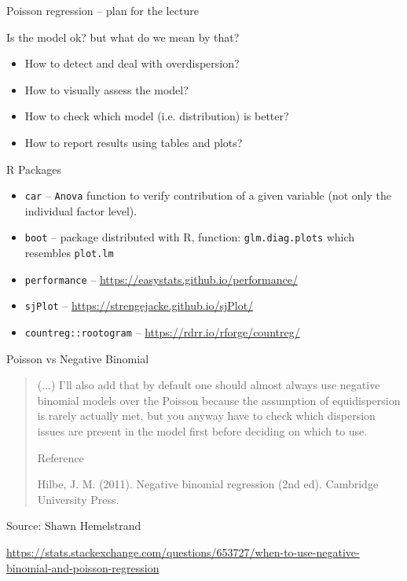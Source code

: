 \documentclass[10pt,ignorenonframetext,aspectratio=169]{beamer}
\begin{document}


\begin{frame}{Poisson regression -- plan for the lecture}

Is the model ok? but what do we mean by that? 
    \begin{itemize}
        \item How to detect and deal with overdispersion?
        \item How to visually assess the model?
        \item How to check which model (i.e. distribution) is better?
        \item How to report results using tables and plots?
    \end{itemize}
    
    \vspace{0.5cm}
    
    R Packages
    \begin{itemize}
    \item \texttt{car} -- \texttt{Anova} function to verify contribution of a given variable (not only the individual factor level).
    \item \texttt{boot} -- package distributed with R, function: \texttt{glm.diag.plots} which resembles \texttt{plot.lm} 
    \item \texttt{performance} -- \url{https://easystats.github.io/performance/}
    \item \texttt{sjPlot} -- \url{https://strengejacke.github.io/sjPlot/}
    \item \texttt{countreg::rootogram} -- \url{https://rdrr.io/rforge/countreg/}
\end{itemize}

\end{frame}

\begin{frame}{Poisson vs Negative Binomial}


\begin{quote}
(...) I'll also add that by default one should almost always use negative binomial models over the Poisson because the assumption of equidispersion is rarely actually met, but you anyway have to check which dispersion issues are present in the model first before deciding on which to use.

Reference

Hilbe, J. M. (2011). Negative binomial regression (2nd ed). Cambridge University Press.
\end{quote}

Source: Shawn Hemelstrand

\url{https://stats.stackexchange.com/questions/653727/when-to-use-negative-binomial-and-poisson-regression}
\end{frame}
\end{document}
